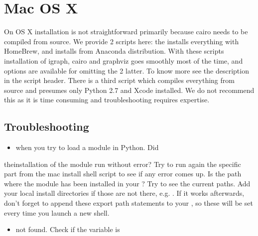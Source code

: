 \documentclass[letterpaper,10pt,english]{sphinxmanual}
\begin{document}
\section{Mac OS X}
\label{\detokenize{installation:mac-os-x}}
On OS X installation is not straightforward primarily because cairo needs to
be compiled from source. We provide 2 scripts here: the
 installs everything with HomeBrew, and
 installs from Anaconda distribution. With these
scripts installation of igraph, cairo and graphviz goes smoothly most of the
time, and options are available for omitting the 2 latter. To know more see
the description in the script header. There is a third script
 which compiles everything from source and presumes
only Python 2.7 and Xcode installed. We do not recommend this as it is time
consuming and troubleshooting requires expertise.


\subsection{Troubleshooting}
\label{\detokenize{installation:troubleshooting}}\begin{itemize}
\item {} 
 when you try to load a module in Python. Did

\end{itemize}

theinstallation of the module run without error? Try to run again the specific
part from the mac install shell script to see if any error comes up. Is the
path where the module has been installed in your ? Try  to see the current paths. Add your local install directories if
those are not there, e.g.
.
If it works afterwards, don’t forget to append these export path statements to
your , so these will be set every time you launch a new
shell.
\begin{itemize}
\item {} 
 not found. Check if the  variable is

\end{itemize}
\end{document}
